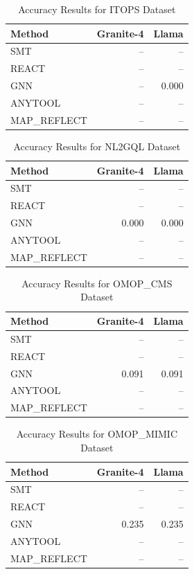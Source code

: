 
\begin{table}[htbp]
\centering
\caption{Accuracy Results for ITOPS Dataset}
\label{tab:itops_accuracy}
\begin{tabular}{lrr}
\toprule
\textbf{Method} & \textbf{Granite-4} & \textbf{Llama} \\
\midrule
SMT & -- & -- \\
REACT & -- & -- \\
GNN & -- & 0.000 \\
ANYTOOL & -- & -- \\
MAP_REFLECT & -- & -- \\
\bottomrule
\end{tabular}
\end{table}

\begin{table}[htbp]
\centering
\caption{Accuracy Results for NL2GQL Dataset}
\label{tab:nl2gql_accuracy}
\begin{tabular}{lrr}
\toprule
\textbf{Method} & \textbf{Granite-4} & \textbf{Llama} \\
\midrule
SMT & -- & -- \\
REACT & -- & -- \\
GNN & 0.000 & 0.000 \\
ANYTOOL & -- & -- \\
MAP_REFLECT & -- & -- \\
\bottomrule
\end{tabular}
\end{table}

\begin{table}[htbp]
\centering
\caption{Accuracy Results for OMOP_CMS Dataset}
\label{tab:omop_cms_accuracy}
\begin{tabular}{lrr}
\toprule
\textbf{Method} & \textbf{Granite-4} & \textbf{Llama} \\
\midrule
SMT & -- & -- \\
REACT & -- & -- \\
GNN & 0.091 & 0.091 \\
ANYTOOL & -- & -- \\
MAP_REFLECT & -- & -- \\
\bottomrule
\end{tabular}
\end{table}

\begin{table}[htbp]
\centering
\caption{Accuracy Results for OMOP_MIMIC Dataset}
\label{tab:omop_mimic_accuracy}
\begin{tabular}{lrr}
\toprule
\textbf{Method} & \textbf{Granite-4} & \textbf{Llama} \\
\midrule
SMT & -- & -- \\
REACT & -- & -- \\
GNN & 0.235 & 0.235 \\
ANYTOOL & -- & -- \\
MAP_REFLECT & -- & -- \\
\bottomrule
\end{tabular}
\end{table}

